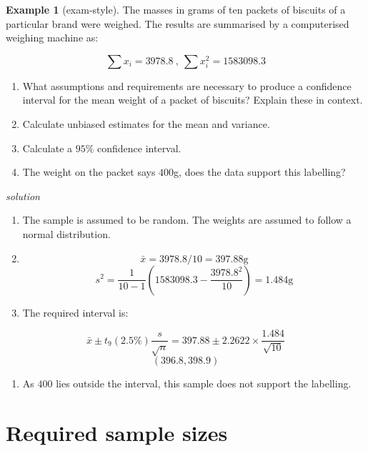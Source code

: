\documentclass[
]{book}
\providecommand{\tightlist}{%
  \setlength{\itemsep}{0pt}\setlength{\parskip}{0pt}}
\theoremstyle{definition}
\theoremstyle{definition}
\newtheorem{example}{Example}[chapter]
\theoremstyle{definition}
\theoremstyle{definition}
\theoremstyle{remark}
\begin{document}
\begin{example}[exam-style]

The masses in grams of ten packets of biscuits of a particular brand were weighed. The results are summarised by a computerised weighing machine as:

\[\sum x_i = 3978.8 \ , \ \sum x_i^2 = 1583098.3 \]

\begin{enumerate}
\def\labelenumi{\alph{enumi})}
\item
  What assumptions and requirements are necessary to produce a
  confidence interval for the mean weight of a packet of biscuits? Explain these in context.
\item
  Calculate unbiased estimates for the mean and variance.
\item
  Calculate a \(95\%\) confidence interval.
\item
  The weight on the packet says \(400\)g, does the data support this labelling?
\end{enumerate}

\end{example}

\emph{solution}

\begin{enumerate}
\def\labelenumi{\alph{enumi})}
\item
  The sample is assumed to be random. The weights are assumed to follow a normal distribution.
\item
  \[\bar{x} = 3978.8/10 = 397.88\text{g}\]
  \[s^2 = \frac{1}{10-1}\left(1583098.3-\frac{3978.8^2}{10}\right) =1.484\text{g}\]
\item
  The required interval is:
\end{enumerate}

\[\bar{x} \pm t_{9}(2.5\%)\frac{s}{\sqrt{n}} = 397.88 \pm 2.2622\times \frac{1.484}{\sqrt{10}}\]
\[(396.8,398.9 ) \]

\begin{enumerate}
\def\labelenumi{\alph{enumi})}
\setcounter{enumi}{3}
\tightlist
\item
  As \(400\) lies outside the interval, this sample does not support the labelling.
\end{enumerate}

\hypertarget{required-sample-sizes}{%
\section{Required sample sizes}\label{required-sample-sizes}}
\end{document}
